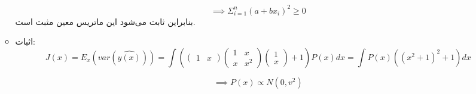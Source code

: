\begin{itemize}
\begin{itemize}
	$$
	\implies \Sigma_{i = 1}^{n}(a + bx_i)^2 \geq 0
	$$
	بنابراین ثابت می‌شود این ماتریس معین مثبت است.
	\item اثبات:
	$$
	J(x) = E_x(var(\hat{y(x)})) = \int (\begin{pmatrix}
	1 & x
	\end{pmatrix}\begin{pmatrix}
	1 & x \\
	x & x^2
	\end{pmatrix}\begin{pmatrix}
	1 \\
	x
	\end{pmatrix} + 1)P(x)dx = \int P(x)((x^2 + 1)^ 2 + 1)dx
	$$
	
	$$
	\implies P(x) \propto N(0, v^2)
	$$
	\end{itemize}

\end{itemize}